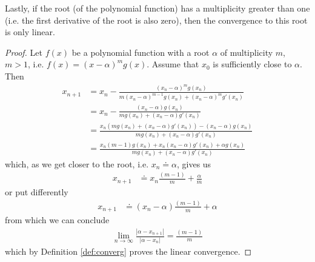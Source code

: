 \documentclass[
  digital, %
  notable,   %
  nolof,     %
  nolot,     %
	draft, %
]{fithesis3}
\begin{document}
Lastly, if the root (of the polynomial function) has a multiplicity greater than one (i.e. the first derivative of the root is also zero), then the convergence to this root is only linear.
\begin{proof}
Let $f(x)$ be a polynomial function with a root $\alpha$ of multiplicity $m$, $m > 1$, i.e. $f(x) = (x-\alpha)^{m}g(x)$. Assume that $x_{0}$ is sufficiently close to $\alpha$. Then
\begin{align}
x_{n+1} &= x_{n} - \frac{(x_{n} - \alpha)^{m}g(x_{n})}{m(x_{n}-\alpha)^{m-1}g(x_{n}) + (x_{n}-\alpha)^{m}g'(x_{n})} \\
&= x_{n} - \frac{(x_{n} - \alpha)g(x_{n})}{mg(x_{n}) + (x_{n}-\alpha)g'(x_{n})} \\
&= \frac{x_{n}(mg(x_{n}) + (x_{n}-\alpha)g'(x_{n})) - (x_{n} - \alpha)g(x_{n})}{mg(x_{n}) + (x_{n}-\alpha)g'(x_{n})} \\
&= \frac{x_{n}(m - 1)g(x_{n}) + x_{n}(x_{n}-\alpha)g'(x_{n}) + {\alpha}g(x_{n})}{mg(x_{n}) + (x_{n}-\alpha)g'(x_{n})}
\end{align}
which, as we get closer to the root, i.e. $x_{n} \doteq \alpha$, gives us
\begin{align}
x_{n+1} &\doteq x_{n}\frac{(m - 1)}{m}+\frac{\alpha}{m}
\end{align}
or put differently
\begin{align}
x_{n+1} &\doteq (x_{n}-\alpha)\frac{(m - 1)}{m}+\alpha
\end{align}
from which we can conclude
\begin{align}
\lim_{n\to\infty}\frac{\left|\alpha - x_{n+1}\right|}{\left|\alpha-x_{n}\right|} = \frac{(m - 1)}{m}
\end{align}
which by Definition \ref{def:converg} proves the linear convergence.
\end{proof}
\end{document}
